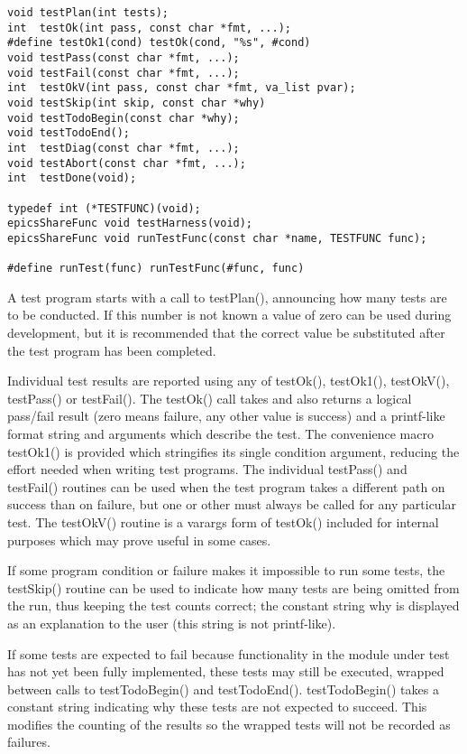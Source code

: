 \begin{verbatim}
void testPlan(int tests);
int  testOk(int pass, const char *fmt, ...);
#define testOk1(cond) testOk(cond, "%s", #cond)
void testPass(const char *fmt, ...);
void testFail(const char *fmt, ...);
int  testOkV(int pass, const char *fmt, va_list pvar);
void testSkip(int skip, const char *why)
void testTodoBegin(const char *why);
void testTodoEnd();
int  testDiag(const char *fmt, ...);
void testAbort(const char *fmt, ...);
int  testDone(void);

typedef int (*TESTFUNC)(void);
epicsShareFunc void testHarness(void);
epicsShareFunc void runTestFunc(const char *name, TESTFUNC func);

#define runTest(func) runTestFunc(#func, func)
\end{verbatim}

A test program starts with a call to testPlan(), announcing how many tests are to be conducted.
If this number is not known a value of zero can be used during development, but it is recommended that the correct value be substituted after the test program has been completed.

Individual test results are reported using any of testOk(), testOk1(), testOkV(), testPass() or testFail().
The testOk() call takes and also returns a logical pass/fail result (zero means failure, any other value is success) and a printf-like format string and arguments which describe the test.
The convenience macro testOk1() is provided which stringifies its single condition argument, reducing the effort needed when writing test programs.
The individual testPass() and testFail() routines can be used when the test program takes a different path on success than on failure, but one or other must always be called for any particular test.
The testOkV() routine is a varargs form of testOk() included for internal purposes which may prove useful in some cases.

If some program condition or failure makes it impossible to run some tests, the testSkip() routine can be used to indicate how many tests are being omitted from the run, thus keeping the test counts correct; the constant string why is displayed as an explanation to the user (this string is not printf-like).

If some tests are expected to fail because functionality in the module under test has not yet been fully implemented, these tests may still be executed, wrapped between calls to testTodoBegin() and testTodoEnd().
testTodoBegin() takes a constant string indicating why these tests are not expected to succeed.
This modifies the counting of the results so the wrapped tests will not be recorded as failures.

